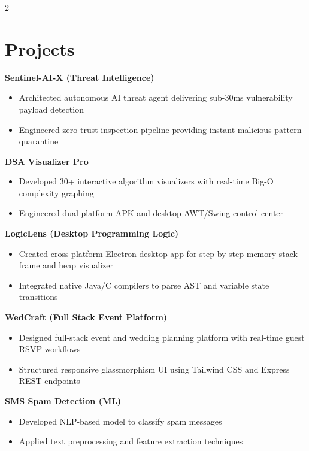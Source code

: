 \documentclass[letterpaper,10pt]{article}
\begin{document}
\begin{paracol}{2}
\switchcolumn

\section*{Projects}

\textbf{Sentinel-AI-X (Threat Intelligence)}
\begin{itemize}
    \item Architected autonomous AI threat agent delivering sub-30ms vulnerability payload detection
    \item Engineered zero-trust inspection pipeline providing instant malicious pattern quarantine
\end{itemize}
\vspace{3pt}

\textbf{DSA Visualizer Pro}
\begin{itemize}
    \item Developed 30+ interactive algorithm visualizers with real-time Big-O complexity graphing
    \item Engineered dual-platform APK and desktop AWT/Swing control center
\end{itemize}
\vspace{3pt}

\textbf{LogicLens (Desktop Programming Logic)}
\begin{itemize}
    \item Created cross-platform Electron desktop app for step-by-step memory stack frame and heap visualizer
    \item Integrated native Java/C compilers to parse AST and variable state transitions
\end{itemize}
\vspace{3pt}

\textbf{WedCraft (Full Stack Event Platform)}
\begin{itemize}
    \item Designed full-stack event and wedding planning platform with real-time guest RSVP workflows
    \item Structured responsive glassmorphism UI using Tailwind CSS and Express REST endpoints
\end{itemize}
\vspace{3pt}

\textbf{SMS Spam Detection (ML)}
\begin{itemize}
    \item Developed NLP-based model to classify spam messages
    \item Applied text preprocessing and feature extraction techniques
\end{itemize}
\vspace{3pt}


\end{paracol}
\end{document}
